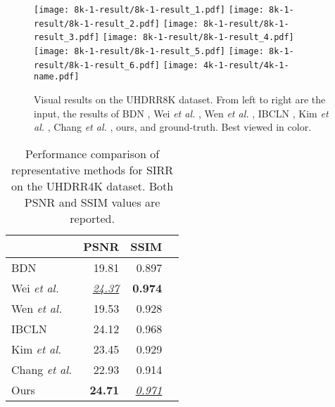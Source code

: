 \documentclass[10pt,journal]{IEEEtran}
\begin{document}
\begin{figure*}[t]
	\centering
	\subfloat
	{
		\texttt{[image: 8k-1-result/8k-1-result\_1.pdf]}
		\label{fig_8k_1_1}
	}
	\vspace{-3mm}
	\subfloat
	{
		\texttt{[image: 8k-1-result/8k-1-result\_2.pdf]}
		\label{fig_8k_1_2}
	}
	\vspace{-3mm}
	\subfloat
	{
		\texttt{[image: 8k-1-result/8k-1-result\_3.pdf]}
		\label{fig_8k_1_3}
	}
	\vspace{-3mm}
	\subfloat
	{
		\texttt{[image: 8k-1-result/8k-1-result\_4.pdf]}
		\label{fig_8k_1_4}
	}
	\vspace{-3mm}
	\subfloat
	{
		\texttt{[image: 8k-1-result/8k-1-result\_5.pdf]}
		\label{fig_8k_1_5}
	}
	\vspace{-3mm}
	\subfloat
	{
		\texttt{[image: 8k-1-result/8k-1-result\_6.pdf]}
		\label{fig_8k_1_6}
	}
	\vspace{-3mm}
	\subfloat
	{
		\texttt{[image: 4k-1-result/4k-1-name.pdf]}
		\label{fig_8k_name}
	}
	\caption{Visual results on the UHDRR8K dataset. From left to right are the input, the results of BDN \cite{yangSeeingDeeplyBidirectionally2018}, Wei \textit{et al.} \cite{weiSingleImageReflection2019}, Wen \textit{et al.} \cite{wenSingleImageReflection2019}, IBCLN \cite{liSingleImageReflection2020}, Kim \textit{et al.} \cite{kimSingleImageReflection2020}, Chang \textit{et al.} \cite{changSingleImageReflection2021}, ours, and ground-truth. Best viewed in color. }
	\label{fig_8k}
\end{figure*}
\begin{table}[t]
	\centering
	\caption{Performance comparison of representative methods for SIRR on the UHDRR4K dataset. Both PSNR and SSIM values are reported. }
	\label{table_4k}
	\begin{tabular}{l|rrr}
		\toprule
		&PSNR&SSIM\\
		\midrule
		BDN \cite{yangSeeingDeeplyBidirectionally2018}&19.81&0.897\\
		Wei \textit{et al.} \cite{weiSingleImageReflection2019}&\underline{\textit{24.37}}&\textbf{0.974}\\
		Wen \textit{et al.} \cite{wenSingleImageReflection2019}&19.53&0.928\\
		IBCLN \cite{liSingleImageReflection2020}&24.12&0.968\\
		Kim \textit{et al.} \cite{kimSingleImageReflection2020}&23.45&0.929\\
		Chang \textit{et al.} \cite{changSingleImageReflection2021}&22.93&0.914\\
		\midrule
		Ours&\textbf{24.71}&\underline{\textit{0.971}}\\
		\bottomrule
	\end{tabular}
\end{table}
\end{document}

